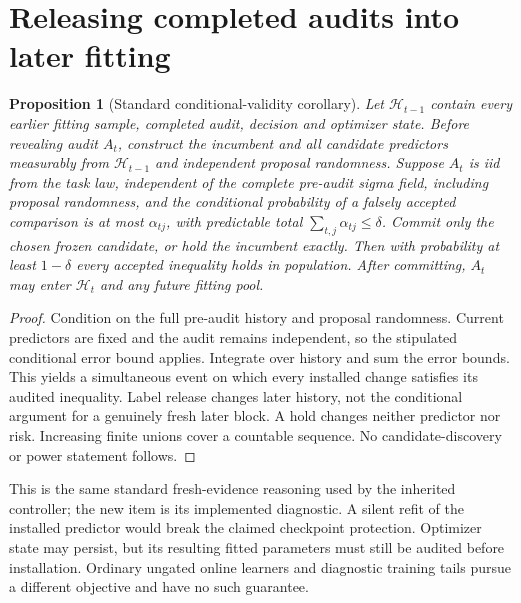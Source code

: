 \documentclass[11pt]{article}
\newtheorem{proposition}[theorem]{Proposition}
\begin{document}


\section{Releasing completed audits into later fitting}
\begin{proposition}[Standard conditional-validity corollary]
Let $\mathcal H_{t-1}$ contain every earlier fitting sample, completed audit,
decision and optimizer state. Before revealing audit $A_t$, construct the
incumbent and all candidate predictors measurably from $\mathcal H_{t-1}$ and
independent proposal randomness. Suppose $A_t$ is iid from the task law,
independent of the complete pre-audit sigma field, including proposal
randomness, and the conditional probability of a falsely
accepted comparison is at most $\alpha_{tj}$, with predictable total
$\sum_{t,j}\alpha_{tj}\le\delta$. Commit only the chosen frozen candidate,
or hold the incumbent exactly. Then with probability at least $1-\delta$
every accepted inequality holds in population. After committing, $A_t$ may
enter $\mathcal H_t$ and any future fitting pool.
\end{proposition}
\begin{proof}
Condition on the full pre-audit history and proposal randomness. Current
predictors are fixed and the audit remains independent, so the stipulated
conditional error bound applies. Integrate over history and sum the error
bounds. This yields a simultaneous event on which every installed change
satisfies its audited inequality. Label release changes later history, not
the conditional argument for a genuinely fresh later block. A hold changes
neither predictor nor risk. Increasing finite unions cover a countable
sequence. No candidate-discovery or power statement follows.
\end{proof}
This is the same standard fresh-evidence reasoning used by the inherited
controller; the new item is its implemented diagnostic. A silent refit of the
installed predictor would break the claimed checkpoint protection. Optimizer
state may persist, but its resulting fitted parameters must still be audited
before installation. Ordinary ungated online learners and diagnostic training
tails pursue a different objective and have no such guarantee.
\end{document}
